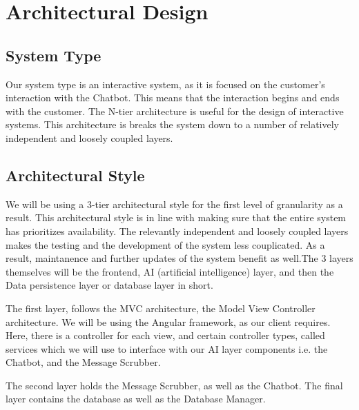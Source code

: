 \documentclass[11pt]{article}
\begin{document}
\section{Architectural Design}

\subsection{System Type}

Our system type is an interactive system, as it is focused on the customer's interaction with the Chatbot. This means that the interaction begins and ends with the customer. The N-tier architecture is useful for the design of interactive systems. This architecture is breaks the system down to a number of relatively independent and loosely coupled layers.\cite{Book:1}

\subsection{Architectural Style}

We will be using a 3-tier architectural style for the first level of granularity as a result. This architectural style is in line with making sure that the entire system has prioritizes availability. The relevantly independent and loosely coupled layers makes the testing and the development of the system less couplicated. As a result, maintanence and further updates of the system benefit as well.The 3 layers themselves will be the frontend, AI (artificial intelligence) layer, and then the Data persistence layer or database layer in short.\par

The first layer, follows the MVC architecture, the Model View Controller architecture. We will be using the Angular framework, as our client requires. Here, there is a controller for each view, and certain controller types, called services which we will use to interface with our AI layer components i.e. the Chatbot, and the Message Scrubber.\par

The second layer holds the Message Scrubber, as well as the Chatbot. The final layer contains the database as well as the Database Manager.
\end{document}
